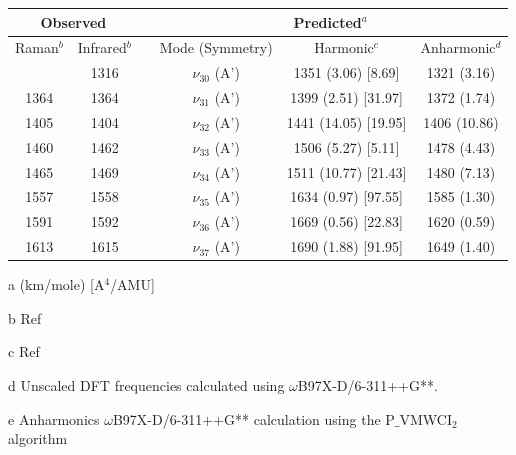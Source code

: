 \begin{table}[H]
	\begin{center}
		\begin{threeparttable}
			\begin{tabular}{c c c c c c}
				\hline
				\multicolumn{ 2}{c}{Observed} & \multicolumn{1}{c}{} & \multicolumn{ 3}{c}{Predicted$^{a}$} \\ \hline
				Raman$^{b}$ & \multicolumn{1}{c}{Infrared$^{b}$} &  & \multicolumn{1}{c}{Mode (Symmetry)} & \multicolumn{1}{c}{Harmonic$^{c}$} & Anharmonic$^{d}$ \\ \hline
\multicolumn{1}{l}{} & 1316 &  & $\nu_{30}$ (A’)& 1351 (3.06) [8.69] & 1321 (3.16) \\ 
1364 & 1364 &  & $\nu_{31}$ (A’)& 1399 (2.51) [31.97] & 1372 (1.74)\\ 
1405 & 1404 &  & $\nu_{32}$ (A’)& 1441 (14.05) [19.95] & 1406 (10.86)\\ 
1460 & 1462 &  & $\nu_{33}$ (A’) & 1506 (5.27) [5.11] & 1478 (4.43) \\ 
1465 & 1469 &  & $\nu_{34}$ (A’) & 1511 (10.77) [21.43] & 1480 (7.13) \\ 
1557 & 1558 &  & $\nu_{35}$ (A’) & 1634 (0.97) [97.55] & 1585 (1.30) \\ 
1591 & 1592 &  & $\nu_{36}$ (A’) & 1669 (0.56) [22.83] & 1620 (0.59) \\ 
1613 & 1615 &  & $\nu_{37}$ (A’) & 1690 (1.88) [91.95] & 1649 (1.40) \\
\bottomrule
\end{tabular}

\begin{tablenotes}
	\item[a] (km/mole) [A$^{4}$/AMU]
	\item[b] Ref \cite{klots1995vibrational}
	\item[c] Ref \cite{el1999dft}
	\item[d] Unscaled DFT frequencies calculated using $\omega$B97X-D/6-311++G**.
	\item[e] Anharmonics $\omega$B97X-D/6-311++G** calculation using the P$\_$VMWCI$_{2}$ algorithm
\end{tablenotes}
\end{threeparttable}
\end{center}
\label{freq-Indene}
\end{table}



